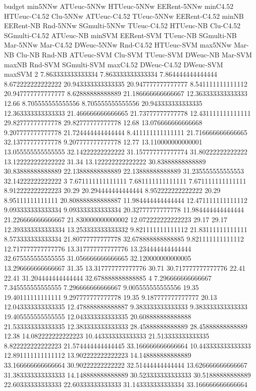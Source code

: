 budget min5NNw ATUeuc-5NNw HTUeuc-5NNw EERent-5NNw minC4.52 HTUeuc-C4.52 Clu-5NNw ATUeuc-C4.52 TUeuc-5NNw EERent-C4.52 minNB EERent-NB Rnd-5NNw SGmulti-5NNw TUeuc-C4.52 HTUeuc-NB Clu-C4.52 SGmulti-C4.52 ATUeuc-NB minSVM EERent-SVM TUeuc-NB SGmulti-NB Mar-5NNw Mar-C4.52 DWeuc-5NNw Rnd-C4.52 HTUeuc-SVM max5NNw Mar-NB Clu-NB Rnd-NB ATUeuc-SVM Clu-SVM TUeuc-SVM DWeuc-NB Mar-SVM maxNB Rnd-SVM SGmulti-SVM maxC4.52 DWeuc-C4.52 DWeuc-SVM maxSVM
2 7.863333333333334 7.863333333333334 7.864444444444444 8.672222222222222 20.943333333333335 20.947777777777777 8.541111111111112 20.947777777777777 8.62888888888889 21.186666666666667 12.363333333333333 12.66 8.705555555555556 8.705555555555556 20.943333333333335 12.363333333333333 21.466666666666665 21.73777777777778 12.431111111111111 29.82777777777778 29.82777777777778 12.68 13.076666666666668 9.207777777777778 21.724444444444444 8.411111111111111 21.716666666666665 32.13777777777778 9.207777777777778 12.77 13.110000000000001 13.055555555555555 32.14222222222222 31.157777777777774 31.80222222222222 13.122222222222222 31.34 13.122222222222222 30.83888888888889 30.83888888888889 22.13888888888889 22.13888888888889 31.235555555555553 32.14222222222222
3 7.671111111111111 7.681111111111111 7.671111111111111 8.912222222222223 20.29 20.294444444444444 8.952222222222222 20.29 8.95111111111111 20.808888888888887 11.984444444444444 12.471111111111112 9.093333333333334 9.093333333333334 20.32777777777778 11.984444444444444 21.226666666666667 21.830000000000002 12.072222222222223 29.17 29.17 12.393333333333334 13.253333333333332 9.821111111111112 21.83111111111111 8.573333333333334 21.80777777777778 32.678888888888885 9.821111111111112 12.717777777777776 13.317777777777776 13.234444444444444 32.675555555555555 31.056666666666665 32.120000000000005 13.296666666666667 31.35 13.317777777777776 30.71 30.717777777777776 22.41 22.41 31.204444444444444 32.678888888888885
4 7.296666666666667 7.345555555555555 7.296666666666667 9.005555555555556 19.35 19.40111111111111 9.297777777777778 19.35 9.187777777777777 20.13 12.043333333333335 12.478888888888887 9.383333333333333 9.383333333333333 19.405555555555555 12.043333333333335 20.608888888888888 21.533333333333335 12.383333333333333 28.45888888888889 28.45888888888889 12.38 14.082222222222223 10.443333333333333 21.513333333333335 8.822222222222223 21.574444444444445 33.166666666666664 10.443333333333333 12.891111111111112 13.902222222222223 14.148888888888889 33.166666666666664 30.90222222222222 32.51444444444444 13.626666666666667 31.383333333333333 14.148888888888889 30.523333333333333 30.51888888888889 22.60333333333333 22.60333333333333 31.143333333333334 33.166666666666664

